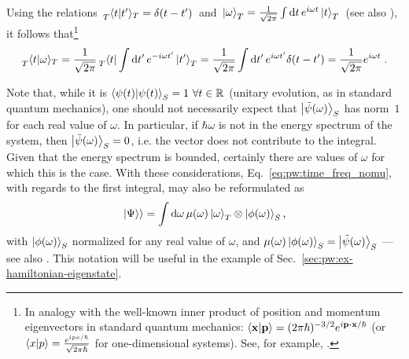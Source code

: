 Using the relations
$
\, \prescript{}{T}{\braket{t}{t'}}_T = \delta(t-t') \,
$
and
$
  \,
  \ket{\omega}_T =
  \frac{1}{\sqrt{2\pi}} \int\dd{t}e^{i\omega t}\ket{t}_T
  \,
$
(see also \cite[2]{Lloyd:Time}),
it follows that\footnote{%
  In analogy with the well-known
  inner product of position and momentum eigenvectors in standard quantum mechanics:
  $\braket{\vb{x}}{\vb{p}} = (2\pi\hbar)^{-3/2}\E^{\iu \vb{p} \vdot \vb{x}  / \hbar}$
  (or $\braket{x}{p} = \frac{e^{i p x / \hbar}}{\sqrt{2\pi\hbar}}$ for one-dimensional systems).
  See, for example, \cite[126--127]{Ballentine}.
}
\begin{equation}\label{eq:pw:tscalaromega}
  \prescript{}{T}{\braket{t}{\omega}}_T =
  \frac{1}{\sqrt{2\pi}}\prescript{}{T}{\bra{t}} \int\dd{t'}e^{-i\omega t'}\ket{t'}_T  =
  \frac{1}{\sqrt{2\pi}}\int\dd{t'}e^{i\omega t'}\delta(t-t') =
  \frac{1}{\sqrt{2\pi}} e^{i\omega t} \; \text{.}
\end{equation}

Note that,
while it is $\braket{\psi(t)}_S = 1 \ \forall t \in \mathbb{R}$ (unitary evolution,
as in standard quantum mechanics),
one should not necessarily expect that
$\ket{\tilde{\psi}(\omega)}_S$ has norm~$1$ for each real value of $\omega$.
In particular, if $\hbar\omega$ is not in the energy spectrum of the system,
then $\ket{\tilde{\psi}(\omega)}_S = 0$, i.e. the vector does not contribute to the integral.
Given that the energy spectrum is bounded,
certainly there are values of $\omega$ for which this is the case.
With these considerations, Eq.~\eqref{eq:pw:time_freq_nomu}, with regards to the first integral, may also be reformulated as
\begin{equation}\label{eq:pw:time_freq_mu}
  \left.\left| \Psi \right\rangle\right\rangle =
    \int \dd{\omega} \mu(\omega) \ket{\omega}_{T} \otimes \ket{\phi(\omega)}_{S} \text{,}
\end{equation}
with $\ket{\phi(\omega)}_{S}$ normalized for any real value of $\omega$,
and $\mu(\omega)\ket{\phi(\omega)}_{S} = \ket{\tilde{\psi}(\omega)}_S$
--- see also \cite[eq.~(10)]{Lloyd:Time}.
This notation will be useful in the example of Sec.~\ref{sec:pw:ex-hamiltonian-eigenstate}.

